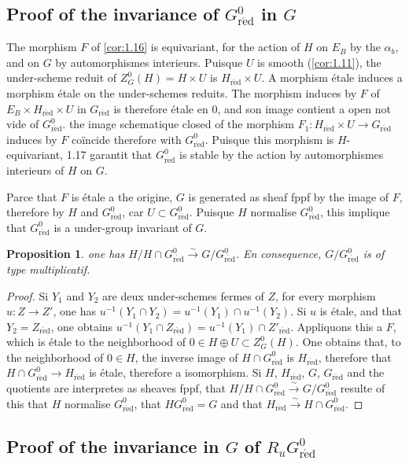 \documentclass[11pt,a4paper]{article}
\theoremstyle{plain}
\newtheorem{proposition}[theorem]{Proposition}
\theoremstyle{definition}
\newcommand{\red}{\mathrm{r\acute{e}d}}
\begin{document}
\subsection{Proof of the invariance of $G^0_\red$ in $G$}\label{sec:1.18}

The morphism $F$ of \ref{cor:1.16} is equivariant, for the action of $H$ on $E_B$ by the $\alpha_b$, and on $G$ by automorphismes interieurs. Puisque $U$ is smooth (\ref{cor:1.11}), the under-scheme reduit of $Z^0_G(H) = H \times U$ is $H_\red \times U$. A morphism étale induces a morphism étale on the under-schemes reduits. The morphism induces by $F$ of $E_B \times H_\red \times U$ in $G_\red$ is therefore étale en $0$, and son image contient a open not vide of $G^0_\red$. the image schematique closed of the morphism $F_1: H_\red \times U \to G_\red$ induces by $F$ co\"incide therefore with $G^0_\red$. Puisque this morphism is $H$-equivariant, 1.17 garantit that $G^0_\red$ is stable by the action by automorphismes interieurs of $H$ on $G$.

Parce that $F$ is étale a the origine, $G$ is generated as sheaf fppf by the image of $F$, therefore by $H$ and $G^0_\red$, car $U \subset G^0_\red$. Puisque $H$ normalise $G^0_\red$, this implique that $G^0_\red$ is a under-group invariant of $G$.

\begin{proposition}\label{sec:1.19}
one has $H/H \cap G^0_\red \xrightarrow{\sim} G/G^0_\red$. En consequence, $G/G^0_\red$ is of type multiplicatif.
\end{proposition}

\begin{proof}
Si $Y_1$ and $Y_2$ are deux under-schemes fermes of $Z$, for every morphism $u: Z \to Z'$, one has $u^{-1}(Y_1 \cap Y_2) = u^{-1}(Y_1) \cap u^{-1}(Y_2)$. Si $u$ is étale, and that $Y_2 = Z_\red$, one obtains $u^{-1}(Y_1 \cap Z_\red) = u^{-1}(Y_1) \cap Z'_\red$. Appliquons this a $F$, which is étale to the neighborhood of $0 \in H \oplus U \subset Z^0_G(H)$. One obtains that, to the neighborhood of $0 \in H$, the inverse image of $H \cap G^0_\red$ is $H_\red$, therefore that $H \cap G^0_\red \to H_\red$ is étale, therefore a isomorphism. Si $H$, $H_\red$, $G$, $G_\red$ and the quotients are interpretes as sheaves fppf, that $H/H \cap G^0_\red \xrightarrow{\sim} G/G^0_\red$ resulte of this that $H$ normalise $G^0_\red$, that $HG^0_\red = G$ and that $H_\red \xrightarrow{\sim} H \cap G^0_\red$.
\end{proof}

\subsection{Proof of the invariance in $G$ of $R_u G^0_\red$}\label{sec:1.20}
\end{document}

